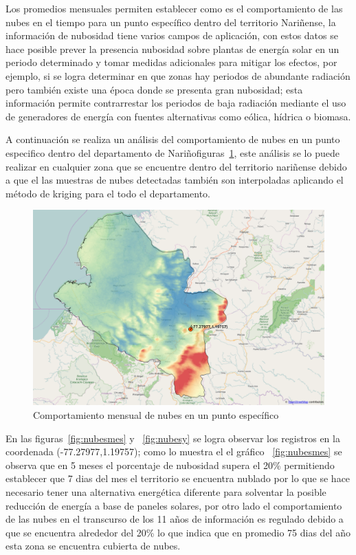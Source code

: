 Los promedios mensuales permiten establecer como es el comportamiento de las nubes en el tiempo para un
punto específico dentro del territorio Nariñense, la información de nubosidad tiene varios campos de aplicación, con estos datos se hace posible 
prever la presencia  nubosidad sobre plantas de energía solar en un periodo determinado y tomar medidas adicionales para mitigar los efectos, 
por ejemplo, si se logra determinar en que zonas hay periodos de abundante radiación pero también existe una época donde se presenta gran nubosidad;
esta información permite contrarrestar los periodos de baja radiación mediante el uso de generadores de energía con fuentes alternativas como eólica, 
hídrica o biomasa.

A continuación se realiza un análisis del comportamiento de nubes en un punto especifico dentro del departamento de Nariñofiguras~\ref{fig:mc}, este análisis se
lo puede realizar en cualquier zona que se encuentre dentro del territorio nariñense debido a que el las muestras de nubes detectadas también son interpoladas 
aplicando el método de kriging para el todo el departamento.
\begin{figure}[htb]
  \centering 
  \includegraphics[scale=0.45]{pictures/mc.png}
  \caption{Comportamiento mensual de nubes en un punto específico}
  \label{fig:mc}
\end{figure}

En las figuras~\ref{fig:nubesmes} y ~\ref{fig:nubesy} se logra observar los registros en la coordenada (-77.27977,1.19757); como lo muestra el el 
gráfico ~\ref{fig:nubesmes} se observa que en 5 meses el porcentaje de nubosidad supera el 20\% permitiendo establecer que 7 dias del mes el territorio 
se encuentra nublado por lo que se hace necesario tener una alternativa energética diferente para solventar la posible reducción de energía a base de 
paneles solares, por otro lado el comportamiento de las nubes en el transcurso de los 11 años de información es regulado debido a que se encuentra alrededor 
del 20\% lo que indica que en promedio 75 dias del año esta zona se encuentra cubierta de nubes.

